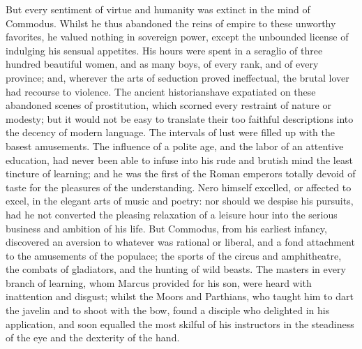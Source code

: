 



But every sentiment of virtue and humanity was extinct in the
mind of Commodus. Whilst he thus abandoned the reins of empire to
these unworthy favorites, he valued nothing in sovereign power,
except the unbounded license of indulging his sensual appetites.
His hours were spent in a seraglio of three hundred beautiful
women, and as many boys, of every rank, and of every province;
and, wherever the arts of seduction proved ineffectual, the
brutal lover had recourse to violence. The ancient historians\footnotemark[29]
have expatiated on these abandoned scenes of prostitution, which
scorned every restraint of nature or modesty; but it would not be
easy to translate their too faithful descriptions into the
decency of modern language. The intervals of lust were filled up
with the basest amusements. The influence of a polite age, and
the labor of an attentive education, had never been able to
infuse into his rude and brutish mind the least tincture of
learning; and he was the first of the Roman emperors totally
devoid of taste for the pleasures of the understanding. Nero
himself excelled, or affected to excel, in the elegant arts of
music and poetry: nor should we despise his pursuits, had he not
converted the pleasing relaxation of a leisure hour into the
serious business and ambition of his life. But Commodus, from his
earliest infancy, discovered an aversion to whatever was rational
or liberal, and a fond attachment to the amusements of the
populace; the sports of the circus and amphitheatre, the combats
of gladiators, and the hunting of wild beasts. The masters in
every branch of learning, whom Marcus provided for his son, were
heard with inattention and disgust; whilst the Moors and
Parthians, who taught him to dart the javelin and to shoot with
the bow, found a disciple who delighted in his application, and
soon equalled the most skilful of his instructors in the
steadiness of the eye and the dexterity of the hand.

